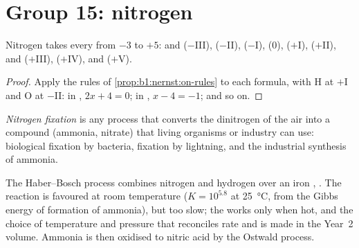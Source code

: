 \section{Group 15: nitrogen}

\begin{proposition}\label{prop:b1:p-block-13-15:nitrogen-ladder}
Nitrogen takes every  from $-3$ to $+5$:  and
 ($-$III),  ($-$II),  ($-$I),  (0),
 ($+$I),  ($+$II),  and  ($+$III),
 ($+$IV),  and  ($+$V).
\end{proposition}

\begin{proof}
Apply the rules of \cref{prop:b1:nernst:on-rules} to each formula, with H
at $+$I and O at $-$II: in , $2x + 4 = 0$; in , $x - 4 =
-1$; and so on.
\end{proof}

\begin{definition}\label{def:b1:p-block-13-15:nitrogen-fixation}
\emph{Nitrogen fixation} is any process that
converts the dinitrogen of the air into a compound (ammonia, nitrate)
that living organisms or industry can use: biological fixation by
bacteria, fixation by lightning, and the industrial synthesis of ammonia.
\end{definition}

The Haber--Bosch process combines nitrogen and hydrogen over an iron
, . The reaction is favoured at room
temperature ($K = 10^{5.8}$ at \qty{25}{\celsius}, from the Gibbs energy of
formation of ammonia), but too slow; the  works only when hot, and
the choice of temperature and pressure that reconciles rate and  is
made in the Year~2 volume. Ammonia is then oxidised to nitric acid by the
Ostwald process.


